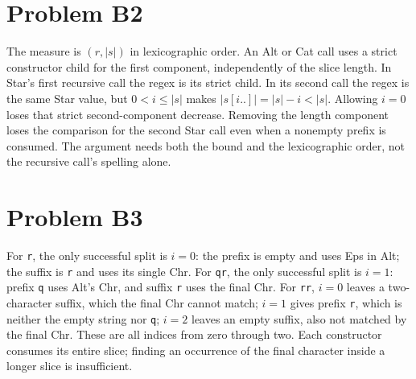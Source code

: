 \documentclass[11pt]{article}
\begin{document}
\section*{Problem B2}\label{ans:B2}
\begin{answer}
The measure is $(r,|s|)$ in lexicographic order. An Alt or Cat call
uses a strict constructor child for the first component, independently of the
slice length. In Star's first recursive call the regex is its strict child.
In its second call the regex is the same Star value, but $0<i\leq |s|$ makes
$|s[i..]|=|s|-i<|s|$. Allowing $i=0$ loses that strict second-component decrease.
Removing the length component loses the comparison for the second Star call
even when a nonempty prefix is consumed. The argument needs both the bound
and the lexicographic order, not the recursive call's spelling alone.
\end{answer}
\section*{Problem B3}\label{ans:B3}
\begin{answer}
For \texttt{r}, the only successful split is $i=0$: the prefix is
empty and uses Eps in Alt; the suffix is \texttt{r} and uses its single Chr.
For \texttt{qr}, the only successful split is $i=1$: prefix \texttt{q} uses
Alt's Chr, and suffix \texttt{r} uses the final Chr. For \texttt{rr}, $i=0$
leaves a two-character suffix, which the final Chr cannot match; $i=1$ gives
prefix \texttt{r}, which is neither the empty string nor \texttt{q}; $i=2$
leaves an empty suffix, also not matched by the final Chr. These are all
indices from zero through two. Each constructor consumes its entire slice;
finding an occurrence of the final character inside a longer slice is insufficient.
\end{answer}
\end{document}
